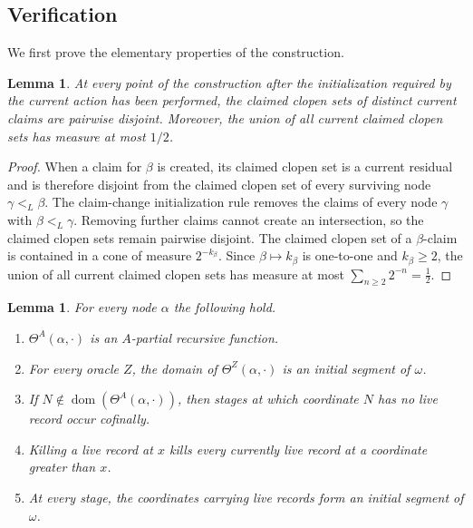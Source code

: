 \documentclass[11pt]{amsart}
\newtheorem{lemma}[theorem]{Lemma}
\begin{document}
\subsection{Verification}

We first prove the elementary properties of the construction. 

\begin{lemma}\label{low2:claim-separation}
At every point of the construction after the initialization required by the
current action has been performed, the claimed clopen sets of distinct
current claims are pairwise disjoint. Moreover, the union of all current
claimed clopen sets has measure at most $1/2$.
\end{lemma}

\begin{proof}
When a claim for $\beta$ is created, its claimed clopen set is a current
residual and is therefore disjoint from the claimed clopen set of every
surviving node $\gamma<_L\beta$. The claim-change initialization rule removes
the claims of every node $\gamma$ with $\beta<_L\gamma$. Removing further
claims cannot create an intersection, so the claimed clopen sets remain
pairwise disjoint.
The claimed clopen set of a $\beta$-claim is contained in a cone of measure
$2^{-k_\beta}$. Since $\beta\mapsto k_\beta$ is one-to-one and
$k_\beta\geq2$, the union of all current claimed clopen sets has measure at
most $\sum_{n\geq2}2^{-n}=\frac12$.
\end{proof}

\begin{lemma}\label{low2:ordered-search-facts}
For every node $\alpha$ the following hold.
\begin{enumerate}[label=(\roman*)]
\item $\Theta^A(\alpha,\cdot)$ is an $A$-partial recursive function.
\item For every oracle $Z$, the domain of $\Theta^Z(\alpha,\cdot)$ is an
      initial segment of $\omega$.
\item If $N\notin\operatorname{dom}(\Theta^A(\alpha,\cdot))$, then stages at
      which coordinate $N$ has no live record occur cofinally.
\item Killing a live record at $x$ kills every currently live record at a
      coordinate greater than $x$.
\item At every stage, the coordinates carrying live records form an initial
      segment of $\omega$.
\end{enumerate}
\end{lemma}
\end{document}
